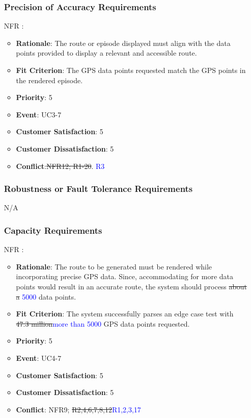 \documentclass[12pt, titlepage]{article}
\newcounter{reqnum} %
\newcounter{freqnum} %
\begin{document}
\begin{itemize}
\subsubsection{Precision of Accuracy Requirements}
\item[NFR\refstepcounter{freqnum}\thefreqnum
\label{NFR}:] 
\begin{itemize}
    \item \textbf{Rationale}: The route or episode displayed must align with the data points provided to display a relevant and accessible route.
    \item \textbf{Fit Criterion}: The GPS data points requested match the GPS points in the rendered episode.
    \item \textbf{Priority}: 5
    \item \textbf{Event}: UC3-7%
    \item \textbf{Customer Satisfaction}: 5
    \item \textbf{Customer Dissatisfaction}: 5
    \item \textbf{Conflict}:\sout{NFR12; R1-20}. \textcolor{blue}{R3}
\end{itemize}
\subsubsection{Robustness or Fault Tolerance Requirements}
N/A
\subsubsection{Capacity Requirements}
\item[NFR\refstepcounter{freqnum}\thefreqnum
\label{NFR}:] 
\begin{itemize}
    \item \textbf{Rationale}: The route to be generated must be rendered while incorporating precise GPS data. Since, accommodating for more data points would result in an accurate route, the system should process \sout{about a} \textcolor{blue}{5000} data points.
    \item \textbf{Fit Criterion}: The system successfully parses an edge case test with \sout{47.3 million}\textcolor{blue}{more than 5000} GPS data points requested.
    \item \textbf{Priority}: 5
    \item \textbf{Event}: UC4-7 %
    \item \textbf{Customer Satisfaction}: 5
    \item \textbf{Customer Dissatisfaction}: 5
    \item \textbf{Conflict}: NFR9; \sout{R2,4,6,7,8,12}\textcolor{blue}{R1,2,3,17}
\end{itemize}

\end{itemize}
\end{document}
